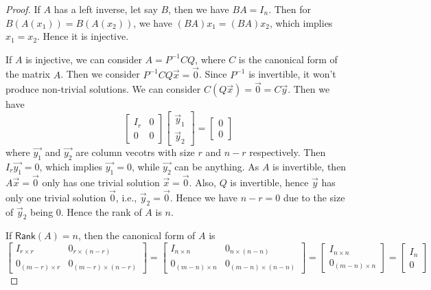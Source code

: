 \documentclass[
	11pt, %
	fleqn, %
	a4paper, %
]{LegrandOrangeBook}
\newcommand{\rank}[1]{\mathsf{Rank}(#1)} %
\begin{document}
\begin{proof}
    If $A$ has a left inverse, let say $B$, then we have $BA = I_n$. Then for $B(A(x_1)) = B(A(x_2))$, we have $(BA)x_1 = (BA)x_2$, which implies $x_1 = x_2$. Hence it is injective.

    If $A$ is injective, we can consider $A = P^{-1}CQ$, where $C$ is the canonical form of the matrix $A$. Then we consider $P^{-1}CQ\vec{x} = \vec{0}$. Since $P^{-1}$ is invertible, it won't produce non-trivial solutions. We can consider $C(Q\vec{x}) = \vec{0} = C\vec{y}$. Then we have 
    \[
        \begin{bmatrix}
            I_r & 0 \\
            0 & 0
        \end{bmatrix} \begin{bmatrix}
            \vec{y}_1 \\
            \vec{y}_2
        \end{bmatrix} = \begin{bmatrix}
            0 \\
            0
        \end{bmatrix}
    \]
    where $\vec{y_1}$ and $\vec{y_2}$ are column vecotrs with size $r$ and $n - r$ respectively. Then $I_r \vec{y_1} = 0$, which implies $\vec{y_1} = 0$, while $\vec{y_2}$ can be anything. As $A$ is invertible, then $A\vec{x} = \vec{0}$ only has one trivial solution $\vec{x} = \vec{0}$. Also, $Q$ is invertible, hence $\vec{y}$ has only one trivial solution $\vec{0}$, i.e., $\vec{y}_2 = \vec{0}$. Hence we have $n - r = 0$ due to the size of $\vec{y}_2$ being 0. Hence the rank of $A$ is $n$.

    If $\rank{A} = n$, then the canonical form of $A$ is 
    \[
        \begin{bmatrix}
            I_{r \times r} & 0_{r \times (n - r)} \\
            0_{(m - r) \times r} & 0_{(m - r) \times (n - r)}
        \end{bmatrix} = \begin{bmatrix}
            I_{n \times n} & 0_{n \times (n - n)} \\
            0_{(m - n) \times n} & 0_{(m - n) \times (n - n)}
        \end{bmatrix} = \begin{bmatrix}
            I_{n \times n} \\
            0_{(m - n) \times n}
        \end{bmatrix} = \begin{bmatrix}
            I_n \\
            0
        \end{bmatrix} 
    \]


\end{proof}
\end{document}
